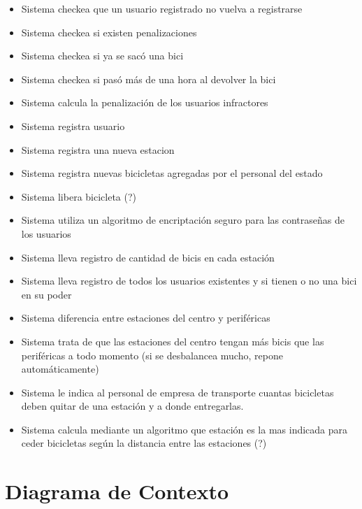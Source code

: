 \documentclass[a4paper, 10pt, twoside]{article}
\begin{document}
\begin{multicols}{2}
  \begin{itemize}
    \item Sistema checkea que un usuario registrado no vuelva a registrarse
    \item Sistema checkea si existen penalizaciones
    \item Sistema checkea si ya se sacó una bici
    \item Sistema checkea si pasó más de una hora al devolver la bici
    \item Sistema calcula la penalización de los usuarios infractores
    \item Sistema registra usuario
    \item Sistema registra una nueva estacion
    \item Sistema registra nuevas bicicletas agregadas por el personal del estado
    \item Sistema libera bicicleta (?)
    \item Sistema utiliza un algoritmo de encriptación seguro para las contraseñas de los usuarios
    \item Sistema lleva registro de cantidad de bicis en cada estación 
    \item Sistema lleva registro de todos los usuarios existentes y si tienen o no una bici en su poder
    \item Sistema diferencia entre estaciones del centro y periféricas 
    \item Sistema trata de que las estaciones del centro tengan más bicis que las periféricas a todo momento (si se desbalancea mucho, repone automáticamente)
    \item Sistema le indica al personal de empresa de transporte cuantas bicicletas deben quitar de una estación y a donde entregarlas.
    \item Sistema calcula mediante un algoritmo que estación es la mas indicada para ceder bicicletas según la distancia entre las estaciones (?)
  \end{itemize}
\end{multicols}




\section{Diagrama de Contexto}
\end{document}
